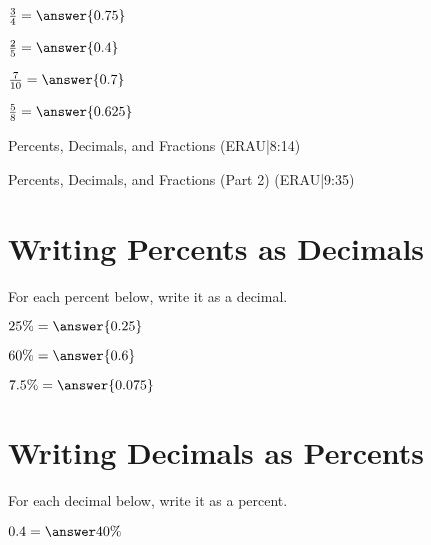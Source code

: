 \documentclass{ximera}
\begin{document}
\begin{problem}
$\frac{3}{4} = \answer{0.75}$
\end{problem}

\begin{problem}
$\frac{2}{5} = \answer{0.4}$
\end{problem}

\begin{problem}
$\frac{7}{10} = \answer{0.7}$
\end{problem}

\begin{problem}
$\frac{5}{8} = \answer{0.625}$
\end{problem}


Percents, Decimals, and Fractions (ERAU|8:14)


Percents, Decimals, and Fractions (Part 2) (ERAU|9:35)



\section*{Writing Percents as Decimals}

For each percent below, write it as a decimal.

\begin{problem}
$25\% = \answer{0.25}$
\end{problem}

\begin{problem}
$60\% = \answer{0.6}$
\end{problem}

\begin{problem}
$7.5\% = \answer{0.075}$
\end{problem}



\section*{Writing Decimals as Percents}

For each decimal below, write it as a percent.

\begin{problem}
$0.4 = \answer{40\%}$
\end{problem}
\end{document}
